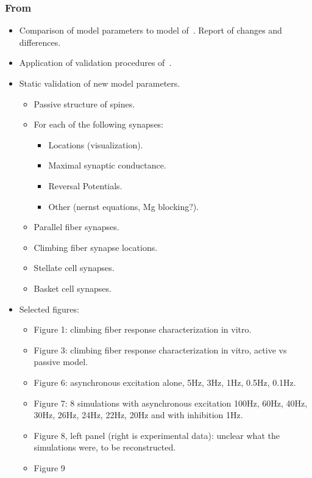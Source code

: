 \documentclass[12pt]{article}
\begin{document}
\subsubsection*{From~\cite{E:1994hc}}

\begin{itemize}
\item Comparison of model parameters to model
  of~\cite{De-Schutter-E:1994vn}.  Report of changes and differences.
\item Application of validation procedures
  of~\cite{De-Schutter-E:1994vn}.
\item Static validation of new model parameters.
  \begin{itemize}
  \item Passive structure of spines.
  \item For each of the following synapses:
    \begin{itemize}
    \item Locations (visualization).
    \item Maximal synaptic conductance.
    \item Reversal Potentials.
    \item Other (nernst equations, Mg blocking?).
    \end{itemize}
  \item Parallel fiber synapses.
  \item Climbing fiber synapse locations.
  \item Stellate cell synapses.
  \item Basket cell synapses.
  \end{itemize}
\item Selected figures:
  \begin{itemize}
  \item Figure 1: climbing fiber response characterization in vitro.
  \item Figure 3: climbing fiber response characterization in vitro,
    active vs passive model.
  \item Figure 6: asynchronous excitation alone, 5Hz, 3Hz, 1Hz, 0.5Hz,
    0.1Hz.
  \item Figure 7: 8 simulations with asynchronous excitation 100Hz,
    60Hz, 40Hz, 30Hz, 26Hz, 24Hz, 22Hz, 20Hz and with inhibition 1Hz.
  \item Figure 8, left panel (right is experimental data): unclear
    what the simulations were, to be reconstructed.
  \item Figure 9
    \begin{itemize}

\end{itemize}
\end{itemize}
\end{itemize}
\end{document}
